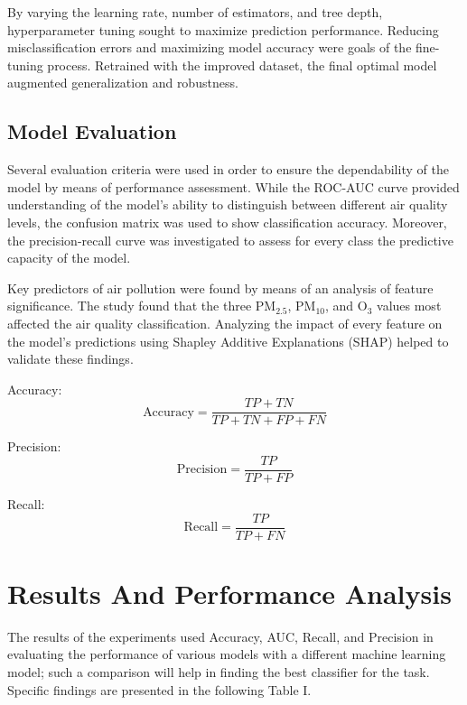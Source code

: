 \documentclass[conference]{IEEEtran}
\begin{document}
By varying the learning rate, number of estimators, and tree depth, hyperparameter tuning sought to maximize prediction performance. Reducing misclassification errors and maximizing model accuracy were goals of the fine-tuning process. Retrained with the improved dataset, the final optimal model augmented generalization and robustness.

\subsection{Model Evaluation}

Several evaluation criteria were used in order to ensure the dependability of the model by means of performance assessment. While the ROC-AUC curve provided understanding of the model's ability to distinguish between different air quality levels, the confusion matrix was used to show classification accuracy. Moreover, the precision-recall curve was investigated to assess for every class the predictive capacity of the model.

Key predictors of air pollution were found by means of an analysis of feature significance. The study found that the three \(\text{PM}_{2.5}\), \(\text{PM}_{10}\), and \(\text{O}_3\) values most affected the air quality classification. Analyzing the impact of every feature on the model's predictions using Shapley Additive Explanations (SHAP) helped to validate these findings.

    Accuracy:
        \begin{equation}
        \text{Accuracy} = \frac{TP + TN}{TP + TN + FP + FN} \tag{6}
        \end{equation}

    Precision:
        \begin{equation}
        \text{Precision} = \frac{TP}{TP + FP} \tag{7}
        \end{equation}
    
    Recall:
        \begin{equation}
        \text{Recall} = \frac{TP}{TP + FN} \tag{8}
        \end{equation}
\vspace{10pt}

\section{Results And Performance Analysis}
The results of the experiments used Accuracy, AUC, Recall, and Precision in evaluating the performance of various models with a different machine learning model; such a comparison will help in finding the best classifier for the task. Specific findings are presented in the following Table I.
\end{document}
